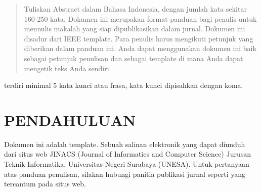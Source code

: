 \documentclass[10pt,twocolumn]{article}
\begin{document}

\begin{abstract}
Tuliskan Abstract dalam Bahasa Indonesia, dengan jumlah kata sekitar 160-250 kata. Dokumen ini merupakan format panduan bagi penulis untuk mennulis makalah yang siap dipublikasikan dalam jurnal. Dokumen ini disadur dari IEEE template. Para penulis harus mengikuti petunjuk yang diberikan dalam panduan ini. Anda dapat menggunakan dokumen ini baik sebagai petunjuk penulisan dan sebagai template di mana Anda dapat mengetik teks Anda sendiri.
\end{abstract}

\begin{keywords}
terdiri minimal 5 kata kunci atau frasa, kata kunci dipisahkan dengan koma.
\end{keywords}

\section{\MakeUppercase{Pendahuluan}}
Dokumen ini adalah template. Sebuah salinan elektronik yang dapat diunduh dari situs web JINACS (Journal of Informatics and Computer Science) Jurusan Teknik Informatika, Universitas Negeri Surabaya (UNESA). Untuk pertanyaan atas panduan penulisan, silakan hubungi panitia publikasi jurnal seperti yang tercantum pada situs web.
\end{document}
